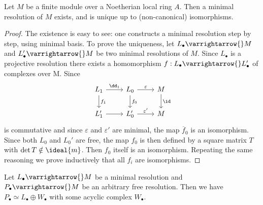 \documentclass[../main]{subfiles}
\begin{document}
\begin{lemma}\label{lem:18.08} Let $M$ be a finite module over a Noetherian local ring $A$. Then a minimal resolution of $M$ exists, and is unique up to (non-canonical) isomorphisms.
\end{lemma}
\begin{proof}
The existence is easy to see: one constructs a minimal resolution step by step, using minimal basis. To prove the uniqueness, let $L_\bullet \varrightarrow{} M$ and $L'_\bullet \varrightarrow{} M$ be two minimal resolutions of $M$. Since $L_\bullet$ is a projective resolution there exists a homomorphism $f : L_\bullet\varrightarrow{} L'_\bullet$ of complexes over M. Since
\[\begin{tikzcd}
L_1\arrow[d,"f_1"] \arrow[r,"\dd_1"] &L_0 \arrow[d,"f_0"]\arrow[r,"\varepsilon"] &M\arrow[d,"\id"]\\ L_1' \arrow[r]& L_0' \arrow[r,"\varepsilon'"] &M
\end{tikzcd}\]
is commutative and since $\varepsilon$ and $\varepsilon'$ are minimal, the map $\overline{f}_{0}$ is an isomorphism. Since both $L_{0}$ and $L_{0}'$ are free, the map $f_{0}$ is then defined by a square matrix $T$ with $\det T \notin \ideal{m}$. Then $f_{0}$ itself is an isomorphism. Repeating the same reasoning we prove inductively that all $f_{i}$ are isomorphisms.
\end{proof}

\begin{exercise} Let $L_\bullet \varrightarrow{} M$ be a minimal resolution and $P_\bullet\varrightarrow{} M$ be an arbitrary free resolution. Then we have $P_\bullet \simeq L_\bullet \oplus W_\bullet$ with some acyclic complex $W_\bullet$.
\end{exercise}
\end{document}

